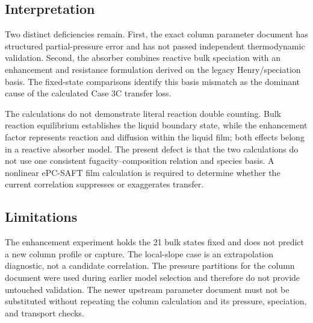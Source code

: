 \subsection*{Interpretation}

Two distinct deficiencies remain.  First, the exact column parameter document
has structured partial-pressure error and has not passed independent
thermodynamic validation.  Second, the absorber combines reactive bulk
speciation with an enhancement and resistance formulation derived on the
legacy Henry/speciation basis.  The fixed-state comparisons identify this
basis mismatch as the dominant cause of the calculated Case 3C transfer loss.

The calculations do not demonstrate literal reaction double counting.  Bulk
reaction equilibrium establishes the liquid boundary state, while the
enhancement factor represents reaction and diffusion within the liquid film;
both effects belong in a reactive absorber model.  The present defect is that
the two calculations do not use one consistent fugacity--composition relation
and species basis.  A nonlinear ePC-SAFT film calculation is required to
determine whether the current correlation suppresses or exaggerates transfer.

\subsection*{Limitations}

The enhancement experiment holds the 21 bulk states fixed and does not predict
a new column profile or capture.  The local-slope case is an extrapolation
diagnostic, not a candidate correlation.  The pressure partitions for the
column document were used during earlier model selection and therefore do not
provide untouched validation.  The newer upstream parameter document must not
be substituted without repeating the column calculation and its pressure,
speciation, and transport checks.

\FloatBarrier
